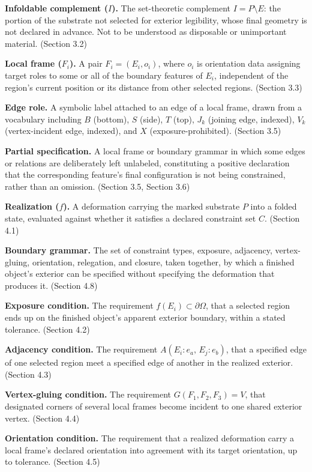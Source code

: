 \documentclass[11pt,oneside]{book}
\begin{document}
\textbf{Infoldable complement (\(I\)).} The set-theoretic complement
\(I = P \setminus E\): the portion of the substrate not selected for
exterior legibility, whose final geometry is not declared in advance.
Not to be understood as disposable or unimportant material. (Section
3.2)

\textbf{Local frame (\(F_i\)).} A pair \(F_i = (E_i, o_i)\), where
\(o_i\) is orientation data assigning target roles to some or all of the
boundary features of \(E_i\), independent of the region's current
position or its distance from other selected regions. (Section 3.3)

\textbf{Edge role.} A symbolic label attached to an edge of a local
frame, drawn from a vocabulary including \(B\) (bottom), \(S\) (side),
\(T\) (top), \(J_k\) (joining edge, indexed), \(V_k\) (vertex-incident
edge, indexed), and \(X\) (exposure-prohibited). (Section 3.5)

\textbf{Partial specification.} A local frame or boundary grammar in
which some edges or relations are deliberately left unlabeled,
constituting a positive declaration that the corresponding feature's
final configuration is not being constrained, rather than an omission.
(Section 3.5, Section 3.6)

\textbf{Realization (\(f\)).} A deformation carrying the marked
substrate \(P\) into a folded state, evaluated against whether it
satisfies a declared constraint set \(C\). (Section 4.1)

\textbf{Boundary grammar.} The set of constraint types, exposure,
adjacency, vertex-gluing, orientation, relegation, and closure, taken
together, by which a finished object's exterior can be specified without
specifying the deformation that produces it. (Section 4.8)

\textbf{Exposure condition.} The requirement
\(f(E_i) \subset \partial\Omega\), that a selected region ends up on the
finished object's apparent exterior boundary, within a stated tolerance.
(Section 4.2)

\textbf{Adjacency condition.} The requirement
\(A(E_i{:}e_a,\, E_j{:}e_b)\), that a specified edge of one selected
region meet a specified edge of another in the realized exterior.
(Section 4.3)

\textbf{Vertex-gluing condition.} The requirement
\(G(F_1, F_2, F_3) = V\), that designated corners of several local
frames become incident to one shared exterior vertex. (Section 4.4)

\textbf{Orientation condition.} The requirement that a realized
deformation carry a local frame's declared orientation into agreement
with its target orientation, up to tolerance. (Section 4.5)
\end{document}
